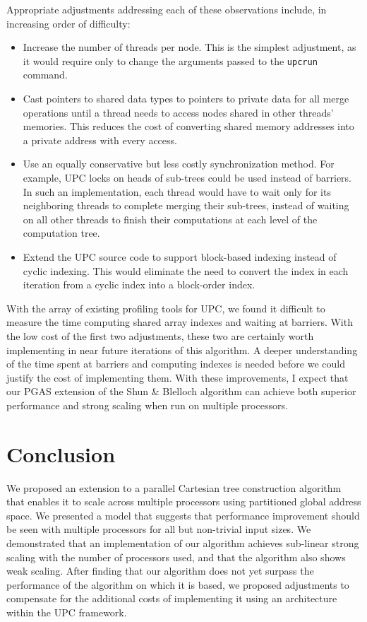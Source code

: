 \documentclass[10pt]{article}
\begin{document}
Appropriate adjustments addressing each of these observations include, in increasing order of
difficulty:
\begin{itemize}
  \item Increase the number of threads per node.  This is the simplest adjustment, as it would
        require only to change the arguments passed to the \texttt{upcrun} command.
  \item Cast pointers to shared data types to pointers to private data for all merge operations
        until a thread needs to access nodes shared in other threads' memories.
        This reduces the cost of converting shared memory addresses into a private address with every
        access.
  \item Use an equally conservative but less costly synchronization method.
        For example, UPC locks on heads of sub-trees could be used instead of barriers.
        In such an implementation, each thread would have to wait only for its neighboring threads
        to complete merging their sub-trees, instead of waiting on all other threads to finish
        their computations at each level of the computation tree.
  \item Extend the UPC source code to support block-based indexing instead of cyclic indexing.
        This would eliminate the need to convert the index in each iteration from a cyclic index
        into a block-order index.
\end{itemize}

With the array of existing profiling tools for UPC, we found it difficult to measure
the time computing shared array indexes and waiting at barriers.
With the low cost of the first two adjustments, these two are
certainly worth implementing in near future iterations of this algorithm.
A deeper understanding of the time spent at barriers and computing indexes is needed before we
could justify the cost of implementing them.
With these improvements, I expect that our PGAS extension of the Shun \& Blelloch algorithm can
achieve both superior performance and strong scaling when run on multiple processors.

\section{Conclusion}

We proposed an extension to a parallel Cartesian tree construction algorithm that enables it to
scale across multiple processors using partitioned global address space.
We presented a model that suggests that performance improvement should be seen with multiple processors 
for all but non-trivial input sizes.
We demonstrated that an implementation of our algorithm achieves sub-linear strong scaling with
the number of processors used, and that the algorithm also shows weak scaling.
After finding that our algorithm does not yet surpass the performance of the algorithm on which
it is based, we proposed adjustments to compensate for the additional costs of implementing
it using an architecture within the UPC framework.
\end{document}
